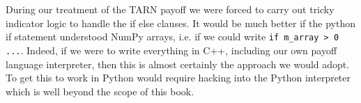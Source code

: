 During our treatment of the TARN payoff we were forced to carry out tricky indicator logic to handle the if else clauses. It would be much better if the python if statement understood NumPy arrays, i.e. if we could write \verb|if m_array > 0 ...|. Indeed, if we were to write everything in C++, including our own payoff language interpreter, then this is almost certainly the approach we would adopt. To get this to work in Python would require hacking into the Python interpreter which is well beyond the scope of this book. 

